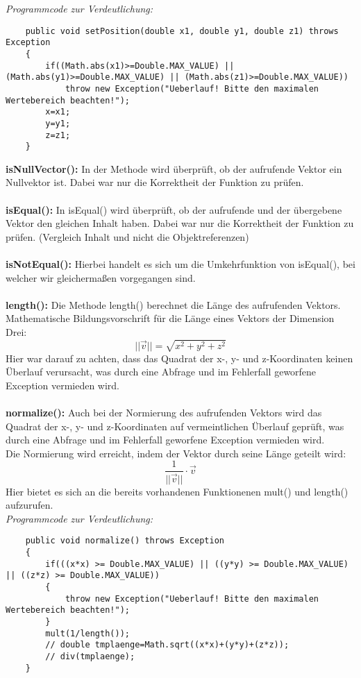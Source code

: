 \documentclass[a4paper,11pt]{scrartcl}
\begin{document}
\textit{Programmcode zur Verdeutlichung:}
\begin{lstlisting}
	public void setPosition(double x1, double y1, double z1) throws Exception
	{
		if((Math.abs(x1)>=Double.MAX_VALUE) || (Math.abs(y1)>=Double.MAX_VALUE) || (Math.abs(z1)>=Double.MAX_VALUE))
			throw new Exception("Ueberlauf! Bitte den maximalen Wertebereich beachten!");
		x=x1;
		y=y1;
		z=z1;
	}
\end{lstlisting} $\;$ \\
\textbf{isNullVector(): } In der Methode wird überprüft, ob der aufrufende Vektor ein Nullvektor ist. Dabei war nur die Korrektheit der Funktion zu prüfen.\\
\\
\textbf{isEqual(): } In isEqual() wird überprüft, ob der aufrufende und der übergebene Vektor den gleichen Inhalt haben. Dabei war nur die Korrektheit der Funktion zu prüfen. (Vergleich Inhalt und nicht die Objektreferenzen)\\
\\
\textbf{isNotEqual(): } Hierbei handelt es sich um die Umkehrfunktion von isEqual(), bei welcher wir gleichermaßen vorgegangen sind.\\
\\
\textbf{length(): } Die Methode length() berechnet die Länge des aufrufenden Vektors.\\
Mathematische Bildungsvorschrift für die Länge eines Vektors der Dimension Drei:
\[ ||\vec v|| = \sqrt{x^2 + y^2 + z^2} \]
Hier war darauf zu achten, dass das Quadrat der x-, y- und z-Koordinaten keinen Überlauf verursacht, was durch eine Abfrage und im Fehlerfall geworfene Exception vermieden wird.\\
\\
\textbf{normalize(): } Auch bei der Normierung des aufrufenden Vektors wird das Quadrat der x-, y- und z-Koordinaten auf vermeintlichen Überlauf geprüft, was durch eine Abfrage und im Fehlerfall geworfene Exception vermieden wird.\\
Die Normierung wird erreicht, indem der Vektor durch seine Länge geteilt wird:
\[ \frac{1}{||\vec v||} \cdot \vec v \]
Hier bietet es sich an die bereits vorhandenen Funktionenen mult() und length() aufzurufen.\\
\textit{Programmcode zur Verdeutlichung:}
\begin{lstlisting}
	public void normalize() throws Exception
	{
		if(((x*x) >= Double.MAX_VALUE) || ((y*y) >= Double.MAX_VALUE) || ((z*z) >= Double.MAX_VALUE))
		{
			throw new Exception("Ueberlauf! Bitte den maximalen Wertebereich beachten!");
		}
		mult(1/length());
		// double tmplaenge=Math.sqrt((x*x)+(y*y)+(z*z));		
		// div(tmplaenge);
	}
\end{lstlisting}
\end{document}

